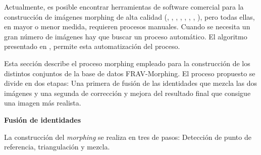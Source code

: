 


Actualmente, es posible encontrar herramientas de software comercial para la construcción de imágenes \gls{morphing} de alta calidad (\cite{FantaMorphOnline}, \cite{MorpheusOnline}, \cite{MorphThingOnline}, \cite{NukeOnline}, \cite{SilhouetteFXOnline}, \cite{GimpOnline}, \cite{FaceMorpherOnline}, \cite{WinMorphOnline}), pero todas ellas, en mayor o menor medida, requieren procesos manuales. Cuando se necesita un gran número de imágenes hay que buscar un proceso automático. El algoritmo presentado en \cite{ferrara2017face}, \cite{scherhag2019face} permite esta automatización del proceso. 

Esta sección describe el proceso \gls{morphing} empleado para la construcción de los distintos conjuntos de la base de datos \Gls{FRAV-Morphing}. El proceso propuesto se divide en dos etapas: Una primera de fusión de las identidades que mezcla las dos imágenes y una segunda de corrección y mejora del resultado final que consigue una imagen más realista.

\medskip
\textbf{Fusión de identidades}
\medskip

La construcción del \textit{morphing} se realiza en tres de pasos: Detección de punto de referencia, triangulación y mezcla.

